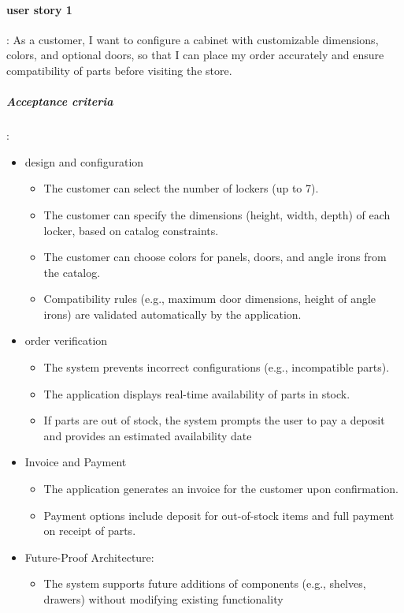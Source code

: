 \documentclass{article}
\begin{document}
\paragraph{user story 1}:
As a customer, I want to configure a cabinet with customizable dimensions, colors, and
optional doors, so that I can place my order accurately and ensure compatibility of parts
before visiting the store.
\subparagraph{Acceptance criteria}:
\begin{itemize}
    \item design and configuration
    \begin{itemize}
        \item The customer can select the number of lockers (up to 7).
        \item The customer can specify the dimensions (height, width, depth) of each locker, based on catalog constraints.
        \item The customer can choose colors for panels, doors, and angle irons from the catalog.
        \item Compatibility rules (e.g., maximum door dimensions, height of angle irons) are validated automatically by the application.
    \end{itemize}
    \item order verification
    \begin{itemize}
        \item The system prevents incorrect configurations (e.g., incompatible parts).
        \item The application displays real-time availability of parts in stock.
        \item If parts are out of stock, the system prompts the user to pay a deposit and provides an estimated availability date
    \end{itemize}
    \item Invoice and Payment
    \begin{itemize}
        \item The application generates an invoice for the customer upon confirmation.
        \item Payment options include deposit for out-of-stock items and full payment on receipt of parts.
    \end{itemize}
    \item Future-Proof Architecture:
    \begin{itemize}
        \item The system supports future additions of components (e.g., shelves, drawers) without modifying existing functionality
    \end{itemize}
\end{itemize}
\end{document}
